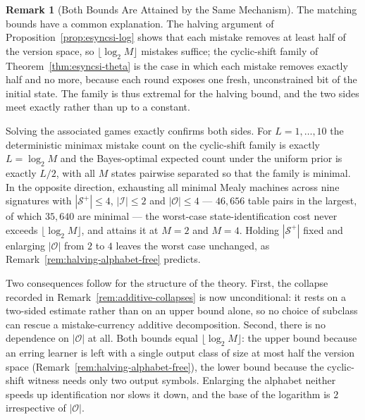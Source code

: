 \documentclass[12pt]{article}
\theoremstyle{definition}
\newtheorem{remark}[theorem]{Remark}
\newcommand{\Splus}{\mathcal S^{+}}
\begin{document}
\begin{remark}[Both Bounds Are Attained by the Same Mechanism]
\label{rem:esyncsi-tight}
The matching bounds have a common explanation.  The halving argument of
Proposition~\ref{prop:esyncsi-log} shows that each mistake removes at least
half of the version space, so $\lfloor\log_2M\rfloor$ mistakes suffice; the
cyclic-shift family of Theorem~\ref{thm:esyncsi-theta} is the case in which
each mistake removes exactly half and no more, because each round exposes one
fresh, unconstrained bit of the initial state.  The family is thus extremal for
the halving bound, and the two sides meet exactly rather than up to a
constant.

Solving the associated games exactly confirms both sides.  For
$L=1,\dots,10$ the deterministic minimax mistake count on the cyclic-shift
family is exactly $L=\log_2M$ and the Bayes-optimal expected count under the
uniform prior is exactly $L/2$, with all $M$ states pairwise separated so that
the family is minimal.  In the opposite direction, exhausting all minimal Mealy
machines across nine signatures with $|\Splus|\le4$, $|\mathcal I|\le2$ and
$|\mathcal O|\le4$ --- $46{,}656$ table pairs in the largest, of which
$35{,}640$ are minimal --- the worst-case state-identification cost never
exceeds $\lfloor\log_2M\rfloor$, and attains it at $M=2$ and $M=4$.  Holding
$|\Splus|$ fixed and enlarging $|\mathcal O|$ from $2$ to $4$ leaves the worst
case unchanged, as Remark~\ref{rem:halving-alphabet-free} predicts.

Two consequences follow for the structure of the theory.  First, the collapse
recorded in Remark~\ref{rem:additive-collapses} is now unconditional: it rests
on a two-sided estimate rather than on an upper bound alone, so no choice of
subclass can rescue a mistake-currency additive decomposition.  Second, there
is no dependence on $|\mathcal O|$ at all.  Both bounds equal
$\lfloor\log_2M\rfloor$: the upper bound because an erring learner is left with
a single output class of size at most half the version space
(Remark~\ref{rem:halving-alphabet-free}), the lower bound because the
cyclic-shift witness needs only two output symbols.  Enlarging the alphabet
neither speeds up identification nor slows it down, and the base of the
logarithm is $2$ irrespective of $|\mathcal O|$.
\end{remark}
\end{document}
